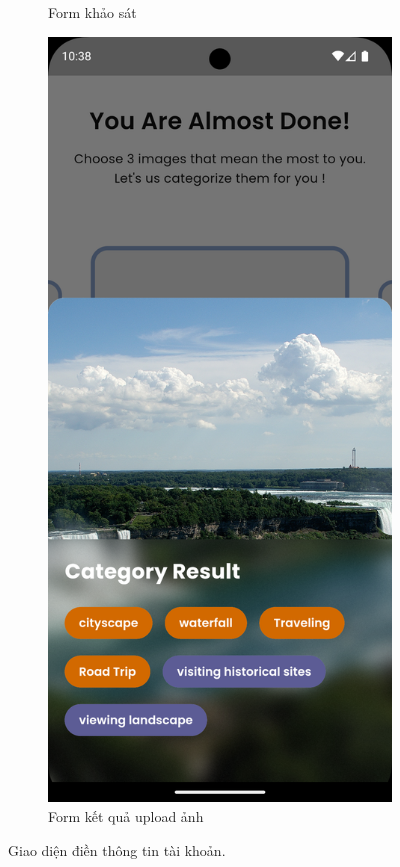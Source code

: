 \begin{figure}[H]
\begin{subfigure}{0.32\textwidth}
        \caption{Form khảo sát}
        \label{fig:upload-form}
    \end{subfigure}
    \hfill
    \begin{subfigure}{0.32\textwidth}
        \includegraphics[width=1\linewidth]{figures/c4/4-2/basic_info_4.png} 
        \caption{Form kết quả upload ảnh}
        \label{fig:survey-form}
    \end{subfigure}
    \caption{Giao diện điền thông tin tài khoản.}
    \label{fig:basic-information-screen}
\end{figure}


